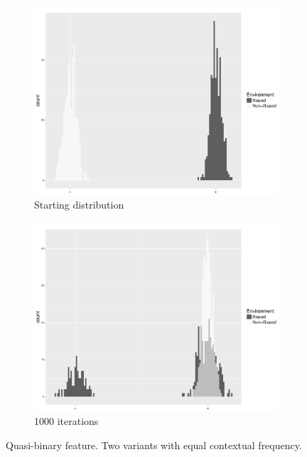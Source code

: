 \begin{figure}[H]
\begin{subfigure}[t]{.5\textwidth}
        \includegraphics[width=\linewidth]{figures/NasalizationStart.pdf}
        \caption{\label{fig:binary-Starting-Distribution}Starting distribution}
    \end{subfigure}%
    \begin{subfigure}[t]{.5\textwidth}
        \includegraphics[width=\linewidth]{figures/Nasalization1000iter.pdf}
        \caption{\label{fig:binary-1000iter}1000 iterations}
    \end{subfigure}
% 
% 

\caption{\label{fig:Context Mismatch Features}Quasi-binary feature. Two variants
with equal contextual frequency.}
\end{figure}
